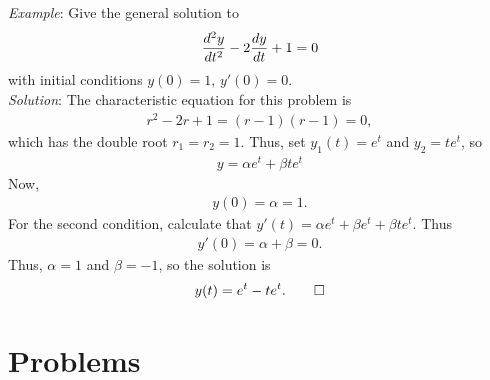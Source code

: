 \documentclass{book}
\begin{document}
\noindent\emph{Example}: Give the general solution to
\begin{align*}
\frac{d^2 y}{d t^2} - 2 \frac{d y}{d t}+1 =0
\end{align*}
with initial conditions $y(0) =1, \, y'(0) =0.$\\
\noindent\emph{Solution}:
The characteristic equation for this problem is
\begin{align*}
r^2 - 2r +1 = (r-1)(r-1) =0,
\end{align*}
which has the double root $r_1=r_2=1$. Thus, set
$y_1(t) = e^t$ and $y_2=t e^t$, so
\begin{align*}
y = \alpha e^t + \beta t e^t
\end{align*}
Now,
\begin{align*}
y(0) = \alpha = 1.
\end{align*}
For the second condition, calculate that
$y'(t) = \alpha e^t + \beta e^t + \beta te^t$. Thus
\begin{align*}
y'(0) = \alpha + \beta =0.
\end{align*}
Thus, $\alpha=1$ and $\beta =-1$, so the solution is
\begin{align*}
y(t) = e^t - te^t. \qed
\end{align*}


\section{Problems}
\end{document}
